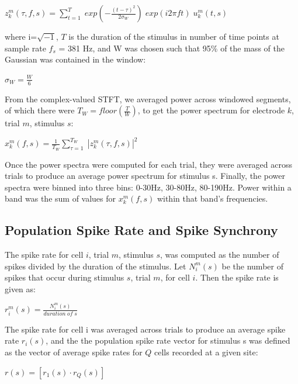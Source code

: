\begin{center}
$z_k ^m (\tau, f, s) = \sum_{t=1}^{T}\; exp(-\frac{(t-\tau)^2}{2 \sigma_W}) \; exp(i 2 \pi f t) \; u_k^m (t, s)$
\end{center}


where i=$\sqrt{-1}$, $T$ is the duration of the stimulus in number of time points at sample rate $f_s$ = 381 Hz, and W was chosen such that 95\% of the mass of the Gaussian was contained in the window:

\begin{center}
$\sigma_W = \frac{W}{6}$
\end{center}

From the complex-valued STFT, we averaged power across  windowed segments, of which there were $T_W = floor(\frac{T}{W})$, to get the power spectrum for electrode $k$, trial $m$, stimulus $s$:

\begin{center}
$x_k^m (f, s) = \frac{1}{T_W} \sum _{\tau = 1}^{T_W} \; | z_k^m (\tau, f, s) | ^2$
\end{center}

Once the power spectra were computed for each trial, they were averaged across trials to produce an average power spectrum for stimulus s. Finally, the power spectra were binned into three bins: 0-30Hz, 30-80Hz, 80-190Hz. Power within a band was the sum of values for $x_k^m (f, s)$ within that band’s frequencies.

\subsection{Population Spike Rate and Spike Synchrony}

    The spike rate for cell $i$, trial $m$, stimulus $s$, was computed as the number of spikes divided by the duration of the stimulus. Let $N_i^m (s)$ be the number of spikes that occur during stimulus $s$, trial $m$, for cell $i$. Then the spike rate is given as:

\begin{center}
$r_i^m (s) = \frac{N_i^m (s)}{duration \; of \; s}$
\end{center}

The spike rate for cell i was averaged across trials to produce an average spike rate $r_i (s)$, and the the population spike rate vector for stimulus s was defined as the vector of average spike rates for $Q$ cells recorded at a given site:

\begin{center}
$r(s) = [r_1(s) \cdot r_Q (s)]$
\end{center}

